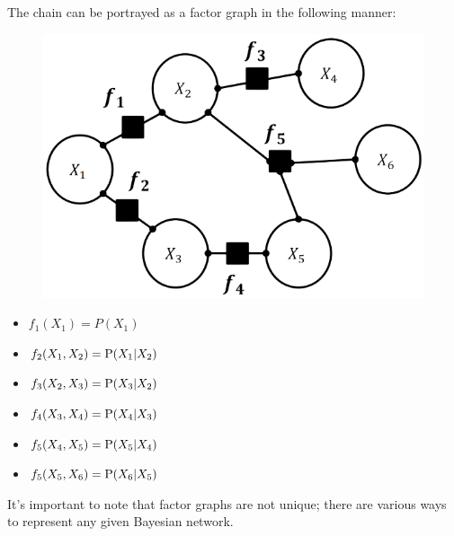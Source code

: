 \documentclass[12pt, a4paper]{report}
\begin{document}
    \begin{example}
        The chain can be portrayed as a factor graph in the following manner:
        \begin{figure}[H]
            \centering
            \includegraphics[width=0.3\linewidth]{images/bnf.png}
        \end{figure}
        \begin{itemize}
            \item $f_1(X_1)=P(X_1)$
            \item $f_2(X_1,X_2)=\textnormal{P}(X_1|X_2)$
            \item $f_3(X_2,X_3)=\textnormal{P}(X_3|X_2)$
            \item $f_4(X_3,X_4)=\textnormal{P}(X_4|X_3)$
            \item $f_5(X_4,X_5)=\textnormal{P}(X_5|X_4)$
            \item $f_5(X_5,X_6)=\textnormal{P}(X_6|X_5)$
        \end{itemize}
    \end{example}
    It's important to note that factor graphs are not unique; there are various ways to represent any given Bayesian network.
\end{document}
